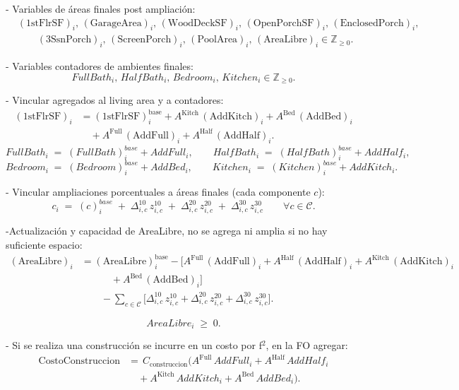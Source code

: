 \begin{itemize}
- Variables de áreas finales post ampliación:
\[
\begin{aligned}
&(\mathrm{1stFlrSF})_i,\, (\mathrm{GarageArea})_i,\, (\mathrm{WoodDeckSF})_i,\, 
(\mathrm{OpenPorchSF})_i,\, (\mathrm{EnclosedPorch})_i,\\[-2pt]
&\qquad
(3\mathrm{SsnPorch})_i,\, (\mathrm{ScreenPorch})_i,\, (\mathrm{PoolArea})_i,\,
(\mathrm{AreaLibre})_i \in \mathbb{Z}_{\ge 0}.
\end{aligned}
\]


- Variables contadores de ambientes finales: 
\[
FullBath_i,\, HalfBath_i,\, Bedroom_i,\, Kitchen_i \in \mathbb{Z}_{\ge 0}.
\]

- Vincular agregados al living area y a contadores:
\[
\begin{aligned}
(\mathrm{1stFlrSF})_i
  &= (\mathrm{1stFlrSF})_i^{\mathrm{base}}
  + A^{\text{Kitch}}\,(\mathrm{AddKitch})_i
  + A^{\text{Bed}}\,(\mathrm{AddBed})_i \\[4pt]
  &\quad
  + A^{\text{Full}}\,(\mathrm{AddFull})_i
  + A^{\text{Half}}\,(\mathrm{AddHalf})_i.
\end{aligned}
\]
\[
FullBath_i \;=\; (FullBath)_i^{base} + AddFull_i,\qquad
HalfBath_i \;=\; (HalfBath)_i^{base} + AddHalf_i,
\]
\[
Bedroom_i \;=\; (Bedroom)_i^{base} + AddBed_i,\qquad
Kitchen_i \;=\; (Kitchen)_i^{base} + AddKitch_i.
\]

- Vincular ampliaciones porcentuales a áreas finales (cada componente \(c\)):
\[
c_i \;=\; (c)_i^{base} \;+\; \Delta^{10}_{i,c}\, z^{10}_{i,c} \;+\; \Delta^{20}_{i,c}\, z^{20}_{i,c} \;+\; \Delta^{30}_{i,c}\, z^{30}_{i,c}
\qquad \forall c\in\mathcal{C}.
\]

-Actualización y capacidad de AreaLibre, no se agrega ni amplia si no hay suficiente espacio:
\[
\begin{aligned}
(\mathrm{AreaLibre})_i
  &= (\mathrm{AreaLibre})_i^{\mathrm{base}}
   - \Big[ A^{\text{Full}}\,(\mathrm{AddFull})_i
   + A^{\text{Half}}\,(\mathrm{AddHalf})_i
   + A^{\text{Kitch}}\,(\mathrm{AddKitch})_i \\[-2pt]
  &\qquad\quad
   + A^{\text{Bed}}\,(\mathrm{AddBed})_i \Big] \\[-2pt]
  &\qquad
   - \sum_{c\in\mathcal{C}}
     \Big[ \Delta^{10}_{i,c}\, z^{10}_{i,c}
          + \Delta^{20}_{i,c}\, z^{20}_{i,c}
          + \Delta^{30}_{i,c}\, z^{30}_{i,c} \Big].
\end{aligned}
\]

\[
AreaLibre_i \;\ge\; 0.
\]


- Si se realiza una construcción se incurre en un costo por f$^2$, en la FO agregar:
\[
\begin{aligned}
\text{CostoConstruccion}
&=\,
C_{\text{construccion}}
\Big(
A^{\text{Full}}\,AddFull_i
+ A^{\text{Half}}\,AddHalf_i\\[4pt]
&\quad
+ A^{\text{Kitch}}\,AddKitch_i
+ A^{\text{Bed}}\,AddBed_i
\Big).
\end{aligned}
\]


\end{itemize}
